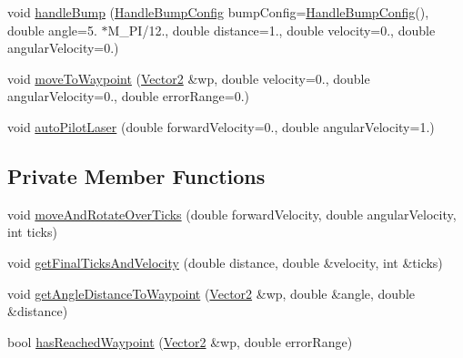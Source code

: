 \begin{DoxyCompactItemize}
\item 
void \hyperlink{classRobot_a1b6e28d4eba7ff9e911bd544e24e3f9b}{handle\+Bump} (\hyperlink{structHandleBumpConfig}{Handle\+Bump\+Config} bump\+Config=\hyperlink{structHandleBumpConfig}{Handle\+Bump\+Config}(), double angle=5. $\ast$M\+\_\+\+PI/12., double distance=1., double velocity=0., double angular\+Velocity=0.)
\item 
void \hyperlink{classRobot_a5c26029a55663078f1a00c2f7eec4e7b}{move\+To\+Waypoint} (\hyperlink{structVector2}{Vector2} \&wp, double velocity=0., double angular\+Velocity=0., double error\+Range=0.)
\item 
void \hyperlink{classRobot_a265b1714581af33680485d17bb496526}{auto\+Pilot\+Laser} (double forward\+Velocity=0., double angular\+Velocity=1.)
\end{DoxyCompactItemize}
\subsection*{Private Member Functions}
\begin{DoxyCompactItemize}
\item 
void \hyperlink{classRobot_aa4b3f22bf6f084baaa9a2e2a8b0e491d}{move\+And\+Rotate\+Over\+Ticks} (double forward\+Velocity, double angular\+Velocity, int ticks)
\item 
void \hyperlink{classRobot_a2ff342657f459c4ab2434706d5e9a2d6}{get\+Final\+Ticks\+And\+Velocity} (double distance, double \&velocity, int \&ticks)
\item 
void \hyperlink{classRobot_ad5ffe11725c6c7ba80fa724ada8771fe}{get\+Angle\+Distance\+To\+Waypoint} (\hyperlink{structVector2}{Vector2} \&wp, double \&angle, double \&distance)
\item 
bool \hyperlink{classRobot_a0de5b178abb5ebcc4f936fb1cf7ca9dc}{has\+Reached\+Waypoint} (\hyperlink{structVector2}{Vector2} \&wp, double error\+Range)
\end{DoxyCompactItemize}
